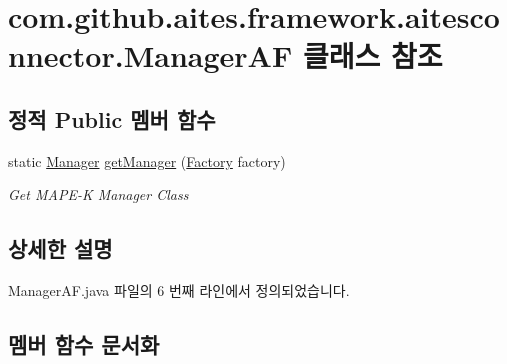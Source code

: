 \hypertarget{classcom_1_1github_1_1aites_1_1framework_1_1aitesconnector_1_1_manager_a_f}{}\section{com.\+github.\+aites.\+framework.\+aitesconnector.\+Manager\+AF 클래스 참조}
\label{classcom_1_1github_1_1aites_1_1framework_1_1aitesconnector_1_1_manager_a_f}
\subsection*{정적 Public 멤버 함수}
\begin{DoxyCompactItemize}
\item 
static \mbox{\hyperlink{classcom_1_1github_1_1aites_1_1framework_1_1aitesmanager_1_1_manager}{Manager}} \mbox{\hyperlink{classcom_1_1github_1_1aites_1_1framework_1_1aitesconnector_1_1_manager_a_f_a45c4774df5361d64d9aa8feeedd05f83}{get\+Manager}} (\mbox{\hyperlink{interfacecom_1_1github_1_1aites_1_1framework_1_1aitesconnector_1_1_factory}{Factory}} factory)
\begin{DoxyCompactList}\small\item\em Get M\+A\+P\+E-\/K Manager Class \end{DoxyCompactList}\end{DoxyCompactItemize}


\subsection{상세한 설명}


Manager\+A\+F.\+java 파일의 6 번째 라인에서 정의되었습니다.



\subsection{멤버 함수 문서화}
\mbox{\label{classcom_1_1github_1_1aites_1_1framework_1_1aitesconnector_1_1_manager_a_f_a45c4774df5361d64d9aa8feeedd05f83}} 
